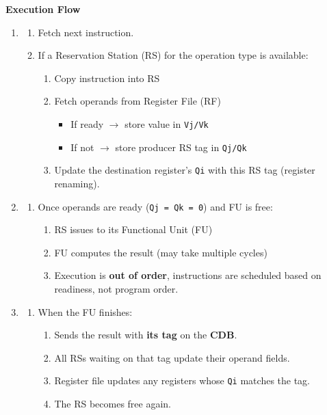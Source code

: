 \begin{flushleft}
    \textcolor{Green3}{ \textbf{Execution Flow}}
\end{flushleft}
\begin{enumerate}
    \item {}
    \begin{enumerate}
        \item Fetch next  instruction.
        \item If a Reservation Station (RS) for the operation type is available:
        \begin{enumerate}
            \item Copy instruction into RS
            \item Fetch operands from Register File (RF)
            \begin{itemize}
                \item If ready $\rightarrow$ store value in \texttt{Vj/Vk}
                \item If not $\rightarrow$ store producer RS tag in \texttt{Qj/Qk}
            \end{itemize}
            \item Update the destination register's \texttt{Qi} with this RS tag (register renaming).
        \end{enumerate}
    \end{enumerate}
    
    \item {}
    \begin{enumerate}
        \item Once operands are ready (\texttt{Qj = Qk = 0}) and FU is free:
        \begin{enumerate}
            \item RS issues to its Functional Unit (FU)
            \item FU computes the result (may take multiple cycles)
            \item Execution is \textbf{out of order}, instructions are scheduled based on readiness, not program order.
        \end{enumerate}
    \end{enumerate}
    
    \item {}
    \begin{enumerate}
        \item When the FU finishes:
        \begin{enumerate}
            \item Sends the result with \textbf{its tag} on the \textbf{CDB}.
            \item All RSs waiting on that tag update their operand fields.
            \item Register file updates any registers whose \texttt{Qi} matches the tag.
            \item The RS becomes free again.
        \end{enumerate}
    \end{enumerate}
\end{enumerate}